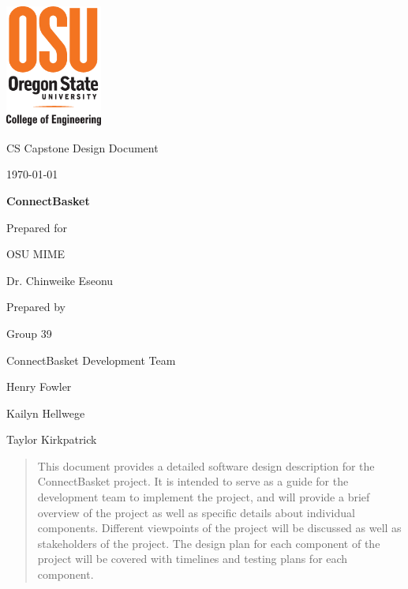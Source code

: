 \documentclass[onecolumn, draftclsnofoot,10pt, compsoc]{IEEEtran}
\def \CapstoneTeamName{		ConnectBasket Development Team}
\def \CapstoneTeamNumber{		39}
\def \GroupMemberOne{			Henry Fowler}
\def \GroupMemberTwo{			Kailyn Hellwege}
\def \GroupMemberThree{			Taylor Kirkpatrick}
\def \CapstoneProjectName{		ConnectBasket}
\def \CapstoneSponsorCompany{	OSU MIME}
\def \CapstoneSponsorPerson{		Dr. Chinweike Eseonu}
\def \DocType{		%
				Design Document
				}
\newcommand{\NameSigPair}[1]{\par
\makebox[2.75in][r]{#1} \hfil 	\makebox[3.25in]{\makebox[2.25in]{\hrulefill} \hfill		\makebox[.75in]{\hrulefill}}
\par\vspace{-12pt} \textit{\tiny\noindent
\makebox[2.75in]{} \hfil		\makebox[3.25in]{\makebox[2.25in][r]{Signature} \hfill	\makebox[.75in][r]{Date}}}}
\renewcommand{\NameSigPair}[1]{#1}
\begin{document}
\begin{titlepage}
    \begin{singlespace}
    	\includegraphics[height=4cm]{coe_v_spot1}
        \hfill 
        \par\vspace{.2in}
        \centering
        \scshape{
            \huge CS Capstone \DocType \par
            {\large\today}\par
            \vspace{.5in}
            \textbf{\Huge\CapstoneProjectName}\par
            \vfill
            {\large Prepared for}\par
            \Huge \CapstoneSponsorCompany\par
            \vspace{5pt}
            {\Large\NameSigPair{\CapstoneSponsorPerson}\par}
            {\large Prepared by }\par
            Group\CapstoneTeamNumber\par
            \CapstoneTeamName\par 
            \vspace{5pt}
            {\Large
                \NameSigPair{\GroupMemberOne}\par
                \NameSigPair{\GroupMemberTwo}\par
                \NameSigPair{\GroupMemberThree}\par
            }
            \vspace{20pt}
        }
        \begin{abstract}
        This document provides a detailed software design description for the ConnectBasket project. It is intended to serve as a guide for the development team to implement the project, and will provide a brief overview of the project as well as specific details about individual components. Different viewpoints of the project will be discussed as well as stakeholders of the project. The design plan for each component of the project will be covered with timelines and testing plans for each component.
        \end{abstract}     
    \end{singlespace}
\end{titlepage}
\newpage
{}
\tableofcontents
\clearpage
\end{document}
